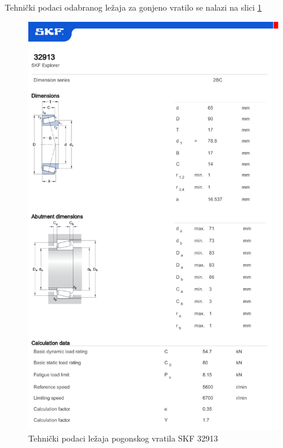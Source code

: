 \documentclass[11pt,a4paper]{report}
\begin{document}
Tehnički podaci odabranog ležaja za gonjeno vratilo se nalazi na slici \ref{fig:lezajGonjenogVratila}
\begin{figure}[h]
\includegraphics[width=1\textwidth]{datasheetsModels/Tapered_roller_bearings_single_row-32913.pdf}
\caption{Tehnički podaci ležaja pogonskog vratila SKF 32913}\label{fig:lezajGonjenogVratila}
\end{figure}


\newpage
\nocite{*}


\newpage
\appendix
{}


\end{document}
